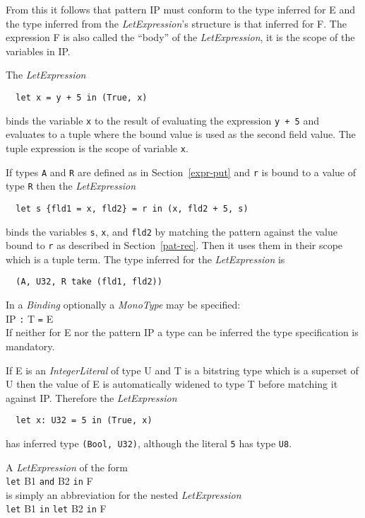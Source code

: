 \documentclass[a4paper]{report}
\newcommand{\code}[1]{\textnormal{\texttt{#1}}}
\begin{document}
From this it follows that pattern IP must conform to the type inferred for E and the type inferred
from the \textit{LetExpression}'s structure is that inferred for F. The expression F is also called the ``body'' of the
\textit{LetExpression}, it is the scope of the variables in IP.

The \textit{LetExpression}
\begin{verbatim}
  let x = y + 5 in (True, x)
\end{verbatim}
binds the variable \code{x} to the result of evaluating the expression \code{y + 5} and evaluates to a tuple
where the bound value is used as the second field value. The tuple expression is the scope of variable \code{x}.

If types \code{A} and \code{R} are defined as in Section~\ref{expr-put} and \code{r} is bound to a value of type \code{R}
then the \textit{LetExpression}
\begin{verbatim}
  let s {fld1 = x, fld2} = r in (x, fld2 + 5, s)
\end{verbatim}
binds the variables \code{s}, \code{x}, and \code{fld2} by matching the pattern against the value bound to \code{r}
as described in Section~\ref{pat-rec}. Then it uses them in their scope which is a tuple term. 
The type inferred for the \textit{LetExpression} is
\begin{verbatim}
  (A, U32, R take (fld1, fld2))
\end{verbatim}

In a \textit{Binding} optionally a \textit{MonoType} may be specified:\\
\hspace*{1cm} IP \code{:} T \code{=} E\\
If neither for E nor the pattern IP a type can be inferred the type specification is mandatory.

 If E is an \textit{IntegerLiteral} of type U  and T is a bitstring type which is a superset of U then 
the value of E is automatically widened to type T before matching it against IP. Therefore the \textit{LetExpression}
\begin{verbatim}
  let x: U32 = 5 in (True, x)
\end{verbatim}
has inferred type \code{(Bool, U32)}, although the literal \code{5} has type \code{U8}.

A \textit{LetExpression} of the form\\
  \hspace*{1cm} \code{let} B1 \code{and} B2 \code{in} F\\
is simply an abbreviation for the nested \textit{LetExpression}\\
  \hspace*{1cm} \code{let} B1 \code{in} \code{let} B2 \code{in} F
\end{document}
